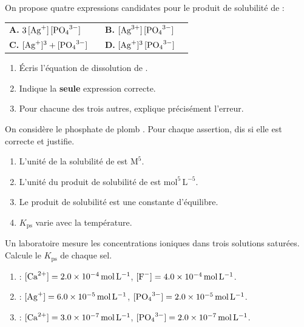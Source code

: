 \documentclass[11pt,a4paper]{article}
\begin{document}
\begin{exo}
On propose quatre expressions candidates pour le produit de solubilité de  :
\begin{center}
\begin{tabular}{ll ll}
\textbf{A.} $3\,[\ce{Ag+}]\,[\ce{PO4^{3-}}]$ &\quad&
\textbf{B.} $[\ce{Ag^{3+}}]\,[\ce{PO4^{3-}}]$ \\[4pt]
\textbf{C.} $[\ce{Ag+}]^{3}+[\ce{PO4^{3-}}]$ &\quad&
\textbf{D.} $[\ce{Ag+}]^{3}\,[\ce{PO4^{3-}}]$ \\
\end{tabular}
\end{center}
\begin{enumerate}[label=\alph*)]
  \item Écris l'équation de dissolution de .
  \item Indique la \textbf{seule} expression correcte.
  \item Pour chacune des trois autres, explique précisément l'erreur.
\end{enumerate}
\end{exo}

\begin{exo}
On considère le phosphate de plomb . Pour chaque assertion, dis si elle est correcte et
justifie.
\begin{enumerate}[label=\alph*)]
  \item L'unité de la solubilité de  est $\mathrm{M}^{5}$.
  \item L'unité du produit de solubilité de  est $\mathrm{mol^{5}\,L^{-5}}$.
  \item Le produit de solubilité est une constante d'équilibre.
  \item $K_{\mathrm{ps}}$ varie avec la température.
\end{enumerate}
\end{exo}

\begin{exo}
Un laboratoire mesure les concentrations ioniques dans trois solutions saturées. Calcule le
$K_{\mathrm{ps}}$ de chaque sel.
\begin{enumerate}[label=\alph*)]
  \item {} : $[\ce{Ca^{2+}}]=\qty{2.0e-4}{\mole\per\litre}$, $[\ce{F-}]=\qty{4.0e-4}{\mole\per\litre}$.
  \item {} : $[\ce{Ag+}]=\qty{6.0e-5}{\mole\per\litre}$, $[\ce{PO4^{3-}}]=\qty{2.0e-5}{\mole\per\litre}$.
  \item {} : $[\ce{Ca^{2+}}]=\qty{3.0e-7}{\mole\per\litre}$, $[\ce{PO4^{3-}}]=\qty{2.0e-7}{\mole\per\litre}$.
\end{enumerate}
\end{exo}
\end{document}
